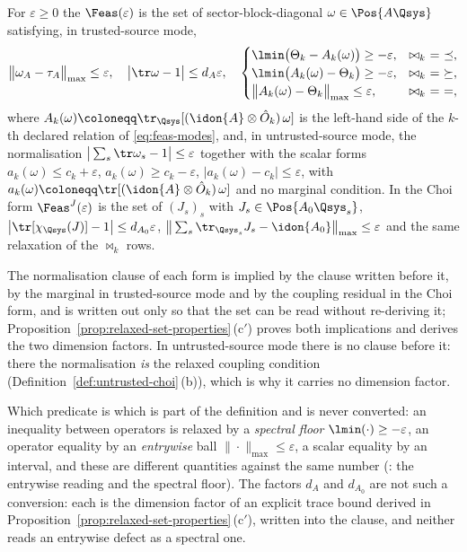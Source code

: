 \begin{definition}\label{def:relaxed-feasible-set}
For $\varepsilon\ge0$ the
$\Feas(\varepsilon)$ is the set of sector-block-diagonal
$\omega\in\Pos{A\Qsys}$ satisfying, in trusted-source mode,
\begin{equation}\label{eq:feas-eps}
  \big\|\omega_A-\tau_A\big\|_{\max}\le\varepsilon,
  \quad
  \big|\tr\omega-1\big|\le d_A\varepsilon,
  \quad
  \begin{cases}
  \lmin\big(\Theta_k-A_k(\omega)\big)\ge-\varepsilon, & \bowtie_k\ =\ \preceq,\\
  \lmin\big(A_k(\omega)-\Theta_k\big)\ge-\varepsilon, & \bowtie_k\ =\ \succeq,\\
  \big\|A_k(\omega)-\Theta_k\big\|_{\max}\le\varepsilon, & \bowtie_k\ =\ =,
  \end{cases}
\end{equation}
where $A_k(\omega)\coloneqq\tr_{\Qsys}[(\idon{A}\otimes\hat O_k)\,\omega]$
is the left-hand side of the $k$-th declared relation of
\eqref{eq:feas-modes}, and, in untrusted-source mode, the normalisation
$\big|\sum_s\tr\omega_s-1\big|\le\varepsilon$ together with the scalar
forms
$a_k(\omega)\le c_k+\varepsilon$, $a_k(\omega)\ge c_k-\varepsilon$,
$|a_k(\omega)-c_k|\le\varepsilon$, with
$a_k(\omega)\coloneqq\tr[(\idon{A}\otimes\hat O_k)\,\omega]$ and no
marginal condition. In the Choi form $\Feas^{J}(\varepsilon)$ is the set of
$(J_s)_s$ with $J_s\in\Pos{A_0\Qsys_s}$,
$\big|\tr[\chi_{\Qsys}(J)]-1\big|\le d_{A_0}\varepsilon$,
$\big\|\sum_s\tr_{\Qsys_s}J_s-\idon{A_0}\big\|_{\max}\le\varepsilon$ and
the same relaxation of the $\bowtie_k$ rows.

The normalisation clause of each form is implied by the clause written
before it, by the marginal in trusted-source mode and by the coupling
residual in the Choi form, and is written out only so that the set can be
read without re-deriving it; Proposition~\ref{prop:relaxed-set-properties}\,(c$'$)
proves both implications and derives the two dimension factors. In
untrusted-source mode there is no clause before it: there the
normalisation \emph{is} the relaxed coupling condition
(Definition~\ref{def:untrusted-choi}\,(b)), which is why it carries no
dimension factor.

Which predicate is which is part of the definition and is never
converted: an inequality between operators is relaxed by a \emph{spectral
floor} $\lmin(\cdot)\ge-\varepsilon$, an operator equality by an
\emph{entrywise} ball $\|\cdot\|_{\max}\le\varepsilon$, a scalar equality
by an interval, and these are different quantities against the same number
(: the entrywise reading and the
spectral floor). The factors $d_A$ and $d_{A_0}$ are not such a
conversion: each is the dimension factor of an explicit trace bound
derived in Proposition~\ref{prop:relaxed-set-properties}\,(c$'$), written
into the clause, and neither reads an entrywise defect as a spectral one.


\end{definition}
